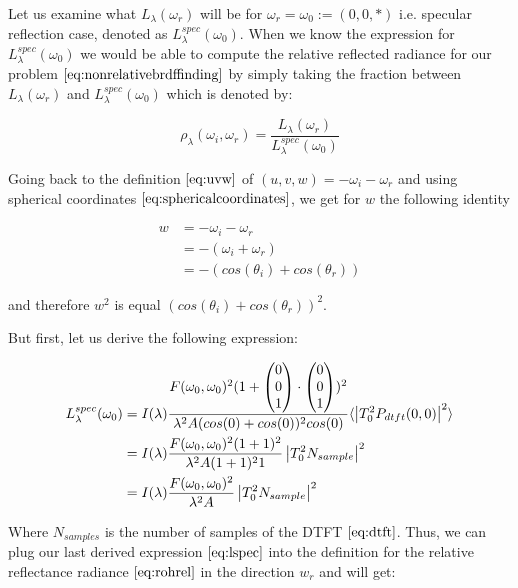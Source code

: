 Let us examine what $L_\lambda(\omega_r)$ will be for $\omega_r = \omega_0 := (0,0,*)$ i.e. specular reflection case, denoted as $L_\lambda^{spec}(\omega_0)$. When we know the expression for $L_\lambda^{spec}(\omega_0)$ we would be able to compute the relative reflected radiance for our problem $\ref{eq:nonrelativebrdffinding}$ by simply taking the fraction between $L_\lambda(\omega_r)$ and $L_\lambda^{spec}(\omega_0)$ which is denoted by: 

\begin{equation}
  \rho_\lambda(\omega_i,\omega_r) = \frac{L_\lambda(\omega_r)}{L_\lambda^{spec}(\omega_0)}
  \label{eq:rohrel}
\end{equation}


Going back to the definition $\ref{eq:uvw}$ of $(u,v,w)= -\omega_i - \omega_r$ and using spherical coordinates $\ref{eq:sphericalcoordinates}$, we get for $w$ the following identity

\begin{align}
w 
&= -\omega_i - \omega_r \nonumber \\ 
&= -(\omega_i + \omega_r) \nonumber \\
&= -\left( cos(\theta_i)+cos(\theta_r) \right) 
\label{eq:sphericalomega}
\end{align}

and therefore $w^2$ is equal $(cos(\theta_i)+cos(\theta_r))^2$. 

But first, let us derive the following expression:

\begin{align}
L_\lambda^{spec}(\omega_0) 
& = I(\lambda) \frac{F(\omega_0, \omega_0)^2 (1+\colvec[0]{0}{1}\cdot\colvec[0]{0}{1})^2}{\lambda^2 A (cos(0)+cos(0))^2 cos(0)} \langle \left|T_0^2 P_{dtft}(0,0)  \right|^2\rangle \nonumber \\
& = I(\lambda) \frac{F(\omega_0, \omega_0)^2 (1+1)^2}{\lambda^2 A (1+1)^2 1}\left| T_0^2 N_{sample} \right|^2 \nonumber \\
& = I(\lambda) \frac{F(\omega_0, \omega_0)^2}{\lambda^2 A}\left| T_0^2 N_{sample} \right|^2 
\label{eq:lspec}
\end{align}

Where $N_{samples}$ is the number of samples of the DTFT $\ref{eq:dtft}$. Thus, we can plug our last derived expression $\ref{eq:lspec}$ into the definition for the relative reflectance radiance $\ref{eq:rohrel}$ in the direction $w_r$ and will get:

